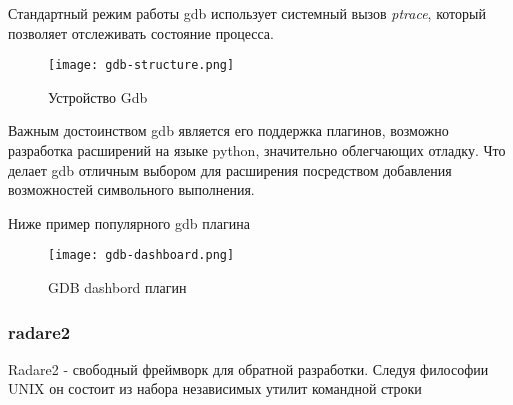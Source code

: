 Стандартный режим работы gdb использует системный вызов {\em ptrace}, который позволяет отслеживать состояние процесса.

\begin{figure}[h]
\centering
\texttt{[image: gdb-structure.png]}
\caption{Устройство Gdb}
\label{fig:gdb1}
\end{figure}

Важным достоинством gdb является его поддержка плагинов, возможно разработка расширений на языке python, значительно облегчающих отладку. Что делает gdb отличным выбором для расширения посредством добавления возможностей символьного выполнения.

Ниже пример популярного gdb плагина

\begin{figure}[h]
\centering
\texttt{[image: gdb-dashboard.png]}
\caption{GDB dashbord плагин}
\label{fig:gdb2}
\end{figure}

\subsubsection{radare2}

Radare2 \cite{r2} - свободный фреймворк для обратной разработки. Следуя философии UNIX он состоит из набора независимых утилит командной строки


